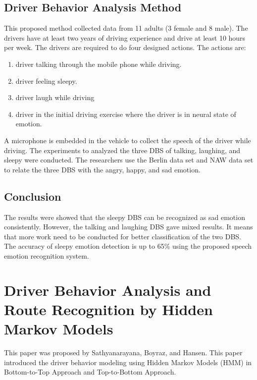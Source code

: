 \subsection{Driver Behavior Analysis Method}
This proposed method collected data from 11 adults (3 female and 8 male). The drivers have at least two years of driving experience and drive at least 10 hours per week. The drivers are required to do four designed actions. The actions are: 
\begin{enumerate}
\item driver talking through the mobile phone while driving.
\item driver feeling sleepy.
\item driver laugh while driving
\item driver in the initial driving exercise where the driver is in neural state of emotion.
\end{enumerate}

A microphone is embedded in the vehicle to collect the speech of the driver while driving. The experiments to analyzed the three DBS of talking, laughing, and sleepy were conducted. The researchers use the Berlin data set and NAW data set to relate the three DBS with the angry, happy, and sad emotion.

\subsection{Conclusion}
The results were showed that the sleepy DBS can be recognized as sad emotion consistently. However, the talking and laughing DBS gave mixed results. It means that more work need to be conducted for better classification of the two DBS. The accuracy of sleepy emotion detection is up to 65\% using the proposed speech emotion recognition system.


\section{Driver Behavior Analysis and Route Recognition by Hidden Markov Models}
This paper was proposed by Sathyanarayana, Boyraz, and Hansen\citeyear{sath:2008}. This paper introduced the driver behavior modeling using Hidden Markov Models (HMM) in Bottom-to-Top Approach and Top-to-Bottom Approach.

